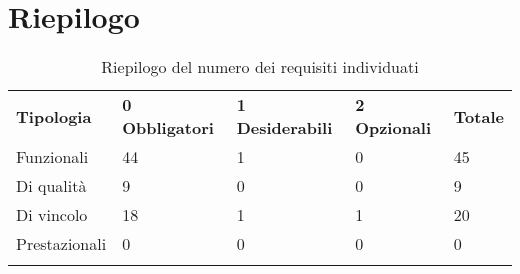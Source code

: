 \documentclass[AnalisiDeiRequisiti.tex]{subfiles}
\begin{document}
\section{Riepilogo}

\label{table:Riepilogo del numero dei requisiti individuati}
\renewcommand*{\arraystretch}{1.2}
\begin{longtable}[H]{p{2.8cm}p{2.9cm}p{2.9cm}p{2.9cm}p{1.5cm}}
	\rowcolor{CHeader}
	\color{CHeaderText} \textbf{Tipologia} & \color{CHeaderText} \textbf{0 Obbligatori} & \color{CHeaderText} \textbf{1 Desiderabili} & \color{CHeaderText} \textbf{2 Opzionali} & \color{CHeaderText} \textbf{Totale} \\  
	Funzionali & 44 & 1 & 0 & 45 \\  
	Di qualità & 9 & 0 & 0 & 9 \\  
	Di vincolo & 18 & 1 & 1 & 20 \\  
	Prestazionali & 0 & 0 & 0 & 0 \\  
	\hiderowcolors
	\caption{Riepilogo del numero dei requisiti individuati}
\end{longtable}
\end{document}
